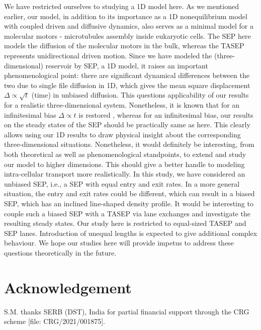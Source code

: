\documentclass[aps,pre,twocolumn,superscriptaddress,amsmath,amssymb,longbibliography,floatfix,nofootinbib]{revtex4}
\begin{document}
{We have restricted ourselves to studying a 1D model here. As we mentioned earlier, our model, in addition to its importance as a 
1D nonequilibrium model with coupled driven and diffusive dynamics, also serves as a minimal
model for a molecular motors - microtubules assembly inside eukaryotic cells. The SEP here models the diffusion
of the molecular motors in the bulk, whereas the TASEP represents unidirectional
driven motion. Since we have modeled
the (three-dimensional) reservoir by SEP, a 1D model, it raises an important phenomenological point: there are significant dynamical differences
between the two due to single file diffusion in 1D, which gives the mean square displacement $ \Delta \propto \sqrt
t$ (time) \cite{1ddiff} in unbiased diffusion. This questions applicability of our results for a realistic three-dimensional system. Nonetheless, it is known that for an infinitesimal bias $\Delta \propto t$ is restored
\cite{bias1,bias2}, whereas for an infinitesimal bias, our results on the steady states of the SEP should be practically same as here. This clearly allows using our 1D results to draw physical insight about the corresponding three-dimensional situations. Nonetheless, it would definitely be interesting, from both theoretical as well as phenomenological standpoints, to extend and study our model to higher dimensions. This should give a better handle to modeling intra-cellular transport more realistically. In this study, we have considered an unbiased SEP, i.e., a SEP with equal entry and exit rates. In a more general situation, the entry and exit rates could be different, which can result in a biased SEP, which has an inclined line-shaped density profile. It would be interesting to couple such a biased SEP with a TASEP via lane exchanges and investigate the resulting steady states. Our study here is restricted to equal-sized TASEP and SEP lanes. Introduction of unequal lengths is expected to give additional complex behaviour. We hope our studies here will provide impetus to address these questions theoretically in the future.



\section{Acknowledgement}

S.M. thanks SERB (DST), India for partial financial support through the CRG scheme [file: CRG/2021/001875].

}
\end{document}
